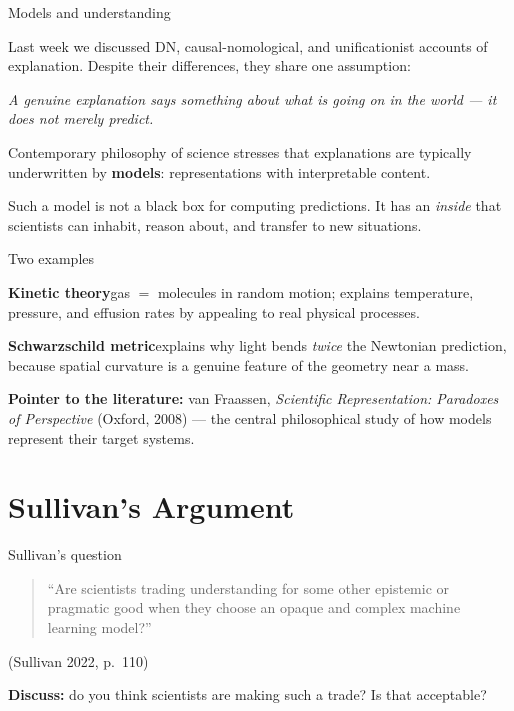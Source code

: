 \documentclass[fleql]{beamer}
\newcommand{\kw}[1]{\textbf{#1}}
\begin{document}
\begin{frame}{Models and understanding}

  Last week we discussed DN, causal-nomological, and
  unificationist accounts of explanation. Despite their
  differences, they share one assumption:

  \vspace{0.4em}
  \begin{center}
  \emph{A genuine explanation says something about what is
  going on in the world --- it does not merely predict.}
  \end{center}

  \vspace{0.4em}
  Contemporary philosophy of science stresses that explanations
  are typically underwritten by \kw{models}: representations
  with interpretable content.

  \vspace{0.4em}
  Such a model is not a black box for computing predictions.
  It has an \emph{inside} that scientists can inhabit,
  reason about, and transfer to new situations.

\end{frame}

\begin{frame}{Two examples}

  \textbf{Kinetic theory}\enspace gas $=$ molecules in random
  motion; explains temperature, pressure, and effusion rates
  by appealing to real physical processes.

  \bigskip

  \textbf{Schwarzschild metric}\enspace explains why light bends
  \emph{twice} the Newtonian prediction, because spatial
  curvature is a genuine feature of the geometry near a mass.

  \bigskip

  \small \textbf{Pointer to the literature:}
  van Fraassen, \textit{Scientific Representation: Paradoxes of
  Perspective} (Oxford, 2008) --- the central philosophical
  study of how models represent their target systems.

\end{frame}

\section{Sullivan's Argument}

\begin{frame}{Sullivan's question}

  \begin{quote}
  ``Are scientists trading understanding for some other epistemic
  or pragmatic good when they choose an opaque and complex machine
  learning model?''
  \end{quote}
  \hfill\small (Sullivan 2022, p.~110)

  \vspace{0.8em}
  \textbf{Discuss:} do you think scientists are making such a trade?
  Is that acceptable?

\end{frame}
\end{document}

